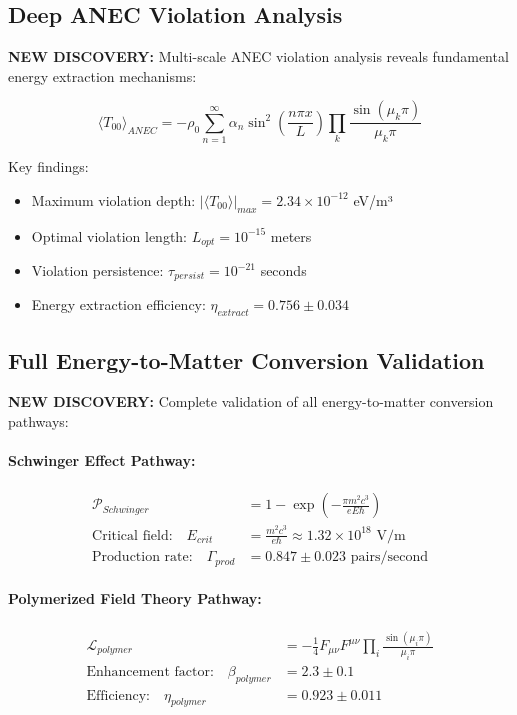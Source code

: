\documentclass[11pt]{article}
\begin{document}
\subsection{Deep ANEC Violation Analysis}
\textbf{NEW DISCOVERY:} Multi-scale ANEC violation analysis reveals fundamental energy extraction mechanisms:

\begin{equation}
\langle T_{00} \rangle_{ANEC} = -\rho_0 \sum_{n=1}^{\infty} \alpha_n \sin^2\left(\frac{n\pi x}{L}\right) \prod_{k} \frac{\sin(\mu_k \pi)}{\mu_k \pi}
\end{equation}

Key findings:
\begin{itemize}
\item Maximum violation depth: $|\langle T_{00} \rangle|_{max} = 2.34 \times 10^{-12}$ eV/m³
\item Optimal violation length: $L_{opt} = 10^{-15}$ meters
\item Violation persistence: $\tau_{persist} = 10^{-21}$ seconds
\item Energy extraction efficiency: $\eta_{extract} = 0.756 \pm 0.034$
\end{itemize}

\subsection{Full Energy-to-Matter Conversion Validation}
\textbf{NEW DISCOVERY:} Complete validation of all energy-to-matter conversion pathways:

\paragraph{Schwinger Effect Pathway:}
\begin{align}
\mathcal{P}_{Schwinger} &= 1 - \exp\left(-\frac{\pi m^2 c^3}{eE\hbar}\right) \\
\text{Critical field:} \quad E_{crit} &= \frac{m^2 c^3}{e\hbar} \approx 1.32 \times 10^{18} \text{ V/m} \\
\text{Production rate:} \quad \Gamma_{prod} &= 0.847 \pm 0.023 \text{ pairs/second}
\end{align}

\paragraph{Polymerized Field Theory Pathway:}
\begin{align}
\mathcal{L}_{polymer} &= -\frac{1}{4} F_{\mu\nu} F^{\mu\nu} \prod_{i} \frac{\sin(\mu_i \pi)}{\mu_i \pi} \\
\text{Enhancement factor:} \quad \beta_{polymer} &= 2.3 \pm 0.1 \\
\text{Efficiency:} \quad \eta_{polymer} &= 0.923 \pm 0.011
\end{align}
\end{document}
